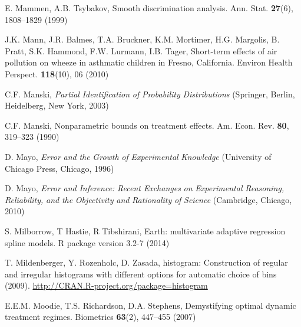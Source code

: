 \begin{list}{}{\setlength{\leftmargin}{2.1em}\setlength{\labelwidth}{0pt}
  \setlength{\labelsep}{0pt}\setlength{\itemindent}{-2.1em}
  \setlength{\parsep}{0pt}\setlength{\itemsep}{2pt}\setlength{\topsep}{0pt}}
\item\label{refentry:REF221}E. Mammen, A.B. Tsybakov, Smooth discrimination analysis. Ann. Stat. \textbf{27}(6), 1808--1829 (1999)\label{refend:REF221}
\item\label{refentry:REF222}J.K. Mann, J.R. Balmes, T.A. Bruckner, K.M. Mortimer, H.G. Margolis, B. Pratt, S.K. Hammond, F.W. Lurmann, I.B. Tager, Short-term effects of air pollution on wheeze in asthmatic children in Fresno, California. Environ Health Perspect. \textbf{118}(10), 06 (2010)\label{refend:REF222}
\item\label{refentry:REF223}C.F. Manski, \textit{Partial} \textit{Identification} \textit{of} \textit{Probability} \textit{Distributions} (Springer, Berlin, Heidelberg, New York, 2003)\label{refend:REF223}
\item\label{refentry:REF224}C.F. Manski, Nonparametric bounds on treatment effects. Am. Econ. Rev. \textbf{80}, 319--323 (1990)\label{refend:REF224}
\item\label{refentry:REF225}D. Mayo, \textit{Error} \textit{and} \textit{the} \textit{Growth} \textit{of} \textit{Experimental} \textit{Knowledge} (University of Chicago Press, Chicago, 1996)\label{refend:REF225}
\item\label{refentry:REF226}D. Mayo, \textit{Error} \textit{and} \textit{Inference:} \textit{Recent} \textit{Exchanges} \textit{on} \textit{Experimental} \textit{Reasoning,} \textit{Reliability,} \textit{and} \textit{the} \textit{Objectivity} \textit{and} \textit{Rationality} \textit{of} \textit{Science} (Cambridge, Chicago, 2010)\label{refend:REF226}
\item\label{refentry:REF227}S. Milborrow, T Hastie, R Tibshirani, Earth: multivariate adaptive regression spline models. R package version 3.2-7 (2014)\label{refend:REF227}
\item\label{refentry:REF228}T. Mildenberger, Y. Rozenholc, D. Zasada, histogram: Construction of regular and irregular histograms with different options for automatic choice of bins (2009). \url{http://CRAN.R-project.org/package=histogram}\label{refend:REF228}
\item\label{refentry:REF229}E.E.M. Moodie, T.S. Richardson, D.A. Stephens, Demystifying optimal dynamic treatment regimes. Biometrics \textbf{63}(2), 447--455 (2007)\label{refend:REF229}

\end{list}
